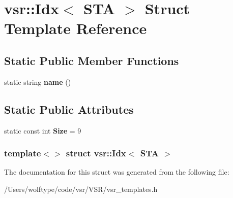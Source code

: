 \hypertarget{structvsr_1_1_idx_3_01_s_t_a_01_4}{\section{vsr\-:\-:Idx$<$ S\-T\-A $>$ Struct Template Reference}
\label{structvsr_1_1_idx_3_01_s_t_a_01_4}
}
\subsection*{Static Public Member Functions}
\begin{DoxyCompactItemize}
\item 
\hypertarget{structvsr_1_1_idx_3_01_s_t_a_01_4_aecfea4d077ab38349a5f1c05f078f1b3}{static string {\bfseries name} ()}\label{structvsr_1_1_idx_3_01_s_t_a_01_4_aecfea4d077ab38349a5f1c05f078f1b3}

\end{DoxyCompactItemize}
\subsection*{Static Public Attributes}
\begin{DoxyCompactItemize}
\item 
\hypertarget{structvsr_1_1_idx_3_01_s_t_a_01_4_a9350a9504c24d3d770ab428a6c77ec1f}{static const int {\bfseries Size} = 9}\label{structvsr_1_1_idx_3_01_s_t_a_01_4_a9350a9504c24d3d770ab428a6c77ec1f}

\end{DoxyCompactItemize}
\subsubsection*{template$<$$>$ struct vsr\-::\-Idx$<$ S\-T\-A $>$}



The documentation for this struct was generated from the following file\-:\begin{DoxyCompactItemize}
\item 
/\-Users/wolftype/code/vsr/\-V\-S\-R/vsr\-\_\-templates.\-h\end{DoxyCompactItemize}
